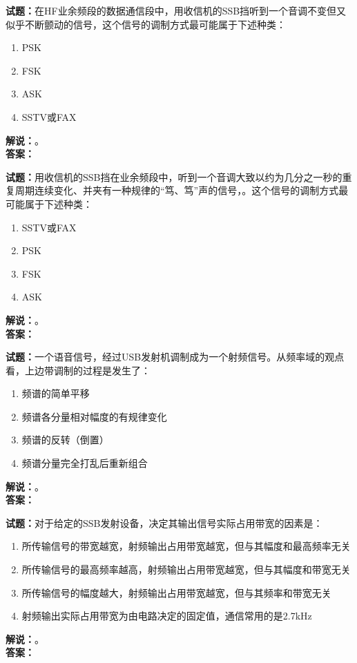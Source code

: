 \documentclass{ctexbook}
\begin{document}
\bigskip




\noindent\textbf{试题：}在HF业余频段的数据通信段中，用收信机的SSB挡听到一个音调不变但又似乎不断颤动的信号，这个信号的调制方式最可能属于下述种类：
\begin{enumerate}[leftmargin=3em]
\item PSK
\item FSK
\item ASK
\item SSTV或FAX
\end{enumerate}
\noindent\textbf{解说：}\textbf{}。\\\noindent\textbf{答案：}

\bigskip




\noindent\textbf{试题：}用收信机的SSB挡在业余频段中，听到一个音调大致以约为几分之一秒的重复周期连续变化、并夹有一种规律的“笃、笃”声的信号，。这个信号的调制方式最可能属于下述种类：
\begin{enumerate}[leftmargin=3em]
\item SSTV或FAX
\item PSK
\item FSK
\item ASK
\end{enumerate}
\noindent\textbf{解说：}\textbf{}。\\\noindent\textbf{答案：}

\bigskip




\noindent\textbf{试题：}一个语音信号，经过USB发射机调制成为一个射频信号。从频率域的观点看，上边带调制的过程是发生了：
\begin{enumerate}[leftmargin=3em]
\item 频谱的简单平移
\item 频谱各分量相对幅度的有规律变化
\item 频谱的反转（倒置）
\item 频谱分量完全打乱后重新组合
\end{enumerate}
\noindent\textbf{解说：}\textbf{}。\\\noindent\textbf{答案：}

\bigskip




\noindent\textbf{试题：}对于给定的SSB发射设备，决定其输出信号实际占用带宽的因素是：
\begin{enumerate}[leftmargin=3em]
\item 所传输信号的带宽越宽，射频输出占用带宽越宽，但与其幅度和最高频率无关
\item 所传输信号的最高频率越高，射频输出占用带宽越宽，但与其幅度和带宽无关
\item 所传输信号的幅度越大，射频输出占用带宽越宽，但与其频率和带宽无关
\item 射频输出实际占用带宽为由电路决定的固定值，通信常用的是2.7\unit{\kHz}
\end{enumerate}
\noindent\textbf{解说：}\textbf{}。\\\noindent\textbf{答案：}
\end{document}
